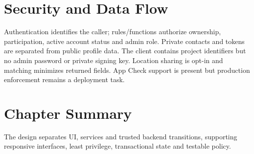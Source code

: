 \section{Security and Data Flow}
Authentication identifies the caller; rules/functions authorize ownership, participation, active account status and admin role. Private contacts and tokens are separated from public profile data. The client contains project identifiers but no admin password or private signing key. Location sharing is opt-in and matching minimizes returned fields. App Check support is present but production enforcement remains a deployment task.
\section{Chapter Summary}
The design separates UI, services and trusted backend transitions, supporting responsive interfaces, least privilege, transactional state and testable policy.

